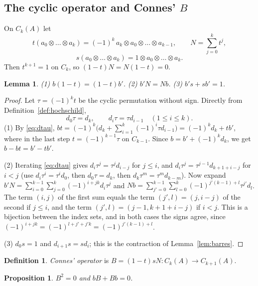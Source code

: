 \documentclass[11pt,oneside,reqno]{article}
\theoremstyle{plain}
\newtheorem{proposition}[theorem]{Proposition}
\newtheorem{lemma}[theorem]{Lemma}
\theoremstyle{definition}
\newtheorem{definition}[theorem]{Definition}
\theoremstyle{remark}
\begin{document}
\subsection{The cyclic operator and Connes' \texorpdfstring{\(B\)}{B}}
On \(C_k(A)\) let
\[
 t(a_0\otimes\dots\otimes a_k)=(-1)^k\,a_k\otimes a_0\otimes\dots\otimes a_{k-1},
 \qquad N=\sum_{j=0}^kt^j,\]
\[
 s(a_0\otimes\dots\otimes a_k)=1\otimes a_0\otimes\dots\otimes a_k .
\]
Then \(t^{k+1}=1\) on \(C_k\), so \((1-t)N=N(1-t)=0\).

\begin{lemma}\label{lem:cyclicid}
\textup{(1)} \(b(1-t)=(1-t)b'\). \textup{(2)} \(b'N=Nb\).
\textup{(3)} \(b's+sb'=1\).
\end{lemma}

\begin{proof}
Let \(\tau=(-1)^kt\) be the cyclic permutation without sign. Directly from
Definition~\ref{def:hochschild},
\begin{equation}\label{eq:dtau}
 d_0\tau=d_k,\qquad d_i\tau=\tau d_{i-1}\quad(1\le i\le k).
\end{equation}
(1) By \eqref{eq:dtau}, \(bt=(-1)^k\bigl(d_k+\sum_{i=1}^k(-1)^i\tau d_{i-1}\bigr)
=(-1)^kd_k+tb'\), where in the last step \(t=(-1)^{k-1}\tau\) on \(C_{k-1}\).
Since \(b=b'+(-1)^kd_k\), we get \(b-bt=b'-tb'\).

(2) Iterating \eqref{eq:dtau} gives \(d_i\tau^j=\tau^jd_{i-j}\) for \(j\le i\), and
\(d_i\tau^j=\tau^{j-1}d_{k+1+i-j}\) for \(i<j\) (use \(d_i\tau^i=\tau^id_0\),
then \(d_0\tau=d_k\), then \(d_k\tau^m=\tau^md_{k-m}\)). Now expand
\(b'N=\sum_{i=0}^{k-1}\sum_{j=0}^k(-1)^{i+jk}d_i\tau^j\) and
\(Nb=\sum_{j'=0}^{k-1}\sum_{l=0}^k(-1)^{j'(k-1)+l}\tau^{j'}d_l\). The term
\((i,j)\) of the first sum equals the term \((j',l)=(j,i-j)\) of the second if
\(j\le i\), and the term \((j',l)=(j-1,k+1+i-j)\) if \(i<j\). This is a
bijection between the index sets, and in both cases the signs agree, since
\((-1)^{i+jk}=(-1)^{l+j'+j'k}=(-1)^{j'(k-1)+l}\).

(3) \(d_0s=1\) and \(d_{i+1}s=sd_i\); this is the contraction of
Lemma~\ref{lem:barres}.
\end{proof}

\begin{definition}
\emph{Connes' operator} is \(B=(1-t)sN:C_k(A)\to C_{k+1}(A)\).
\end{definition}

\begin{proposition}\label{prop:bB}
\(B^2=0\) and \(bB+Bb=0\).
\end{proposition}
\end{document}
